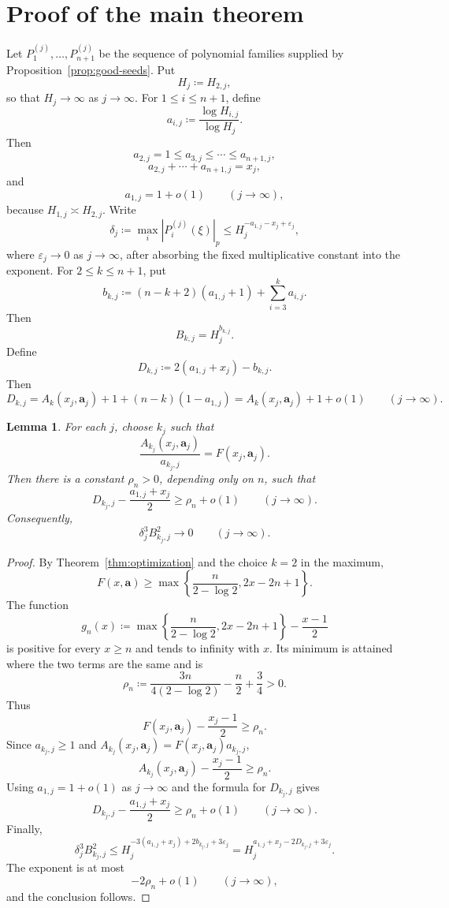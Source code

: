 \documentclass[10pt,a4paper]{amsart}
\newtheorem{lemma}[theorem]{Lemma}
\begin{document}
\bigskip
\section{\bf Proof of the main theorem}
\bigskip

Let $P_1^{(j)},\ldots,P_{n+1}^{(j)}$ be the sequence of polynomial families
supplied by Proposition~\ref{prop:good-seeds}. Put
$$
H_j\coloneqq H_{2,j},
$$
so that $H_j\to\infty$ as $j\to\infty$. For $1\leq i\leq n+1$, define
$$
a_{i,j}\coloneqq\frac{\log H_{i,j}}{\log H_j}.
$$
Then
$$
a_{2,j}=1\leq a_{3,j}\leq\cdots\leq a_{n+1,j},
$$
$$
a_{2,j}+\cdots+a_{n+1,j}=x_j,
$$
and
$$
a_{1,j}=1+o(1)\qquad(j\to\infty),
$$
because $H_{1,j}\asymp H_{2,j}$. Write
$$
\delta_j
\coloneqq\max_i|P_i^{(j)}(\xi)|_p
\leq H_j^{-a_{1,j}-x_j+\varepsilon_j},
$$
where $\varepsilon_j\to0$ as $j\to\infty$, after absorbing the fixed
multiplicative constant into the exponent. For $2\leq k\leq n+1$, put
$$
b_{k,j}\coloneqq(n-k+2)(a_{1,j}+1)+\sum_{i=3}^ka_{i,j}.
$$
Then
$$
B_{k,j}=H_j^{b_{k,j}}.
$$
Define
$$
D_{k,j}\coloneqq2(a_{1,j}+x_j)-b_{k,j}.
$$
Then
$$
D_{k,j}
=A_k(x_j,\mathbf a_j)+1+(n-k)(1-a_{1,j})
=A_k(x_j,\mathbf a_j)+1+o(1)\qquad(j\to\infty).
$$

\begin{lemma}\label{lem:hensel-margin}
For each $j$, choose $k_j$ such that
$$
\frac{A_{k_j}(x_j,\mathbf a_j)}{a_{k_j,j}}=F(x_j,\mathbf a_j).
$$
Then there is a constant $\rho_n>0$, depending only on $n$, such that
$$
D_{k_j,j}-\frac{a_{1,j}+x_j}{2}\geq\rho_n+o(1)
\qquad(j\to\infty).
$$
Consequently,
$$
\delta_j^3B_{k_j,j}^2\longrightarrow0
\qquad(j\to\infty).
$$
\end{lemma}

\begin{proof}
By Theorem~\ref{thm:optimization} and the choice $k=2$ in the maximum,
$$
F(x,\mathbf a)
\geq
\max\left\{
\frac{n}{2-\log2},
2x-2n+1
\right\}.
$$
The function
$$
g_n(x)
\coloneqq
\max\left\{
\frac{n}{2-\log2},
2x-2n+1
\right\}
-\frac{x-1}{2}
$$
is positive for every $x\geq n$ and tends to infinity with $x$. Its minimum is attained where the two terms are the same and is
$$
\rho_n
\coloneqq
\frac{3n}{4(2-\log2)}-\frac n2+\frac34>0.
$$
Thus
$$
F(x_j,\mathbf a_j)-\frac{x_j-1}{2}\geq\rho_n.
$$
Since $a_{k_j,j}\geq1$ and
$A_{k_j}(x_j,\mathbf a_j)=F(x_j,\mathbf a_j)a_{k_j,j}$,
$$
A_{k_j}(x_j,\mathbf a_j)-\frac{x_j-1}{2}\geq\rho_n.
$$
Using $a_{1,j}=1+o(1)$ as $j\to\infty$ and the formula for $D_{k_j,j}$ gives
$$
D_{k_j,j}-\frac{a_{1,j}+x_j}{2}
\geq\rho_n+o(1)\qquad(j\to\infty).
$$
Finally,
$$
\delta_j^3B_{k_j,j}^2
\leq
H_j^{-3(a_{1,j}+x_j)+2b_{k_j,j}+3\varepsilon_j}
=H_j^{a_{1,j}+x_j-2D_{k_j,j}+3\varepsilon_j}.
$$
The exponent is at most
$$
-2\rho_n+o(1)\qquad(j\to\infty),
$$
and the conclusion follows.
\end{proof}
\end{document}
